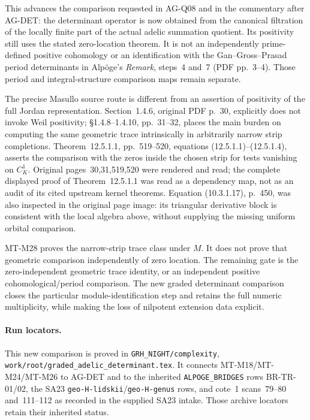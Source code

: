 This advances the comparison requested in
AG-Q08 and in the commentary after AG-DET:
the determinant operator is now obtained
from the canonical filtration of the
locally finite part of the actual
adelic summation quotient. Its positivity
still uses the stated zero-location
theorem. It is not an independently
prime-defined positive cohomology or
an identification with the
Gan--Gross--Prasad period determinants
in Alp\"oge's \emph{Remark}, steps~4
and~7 (PDF pp.~3--4). Those period and
integral-structure comparison maps
remain separate.

The precise Masullo source route is
different from an assertion of positivity
of the full Jordan representation.
Section~1.4.6, original PDF p.~30,
explicitly does not invoke Weil
positivity; \S1.4.8--1.4.10,
pp.~31--32, places the main burden
on computing the same geometric
trace intrinsically in arbitrarily
narrow strip completions.
Theorem~12.5.1.1, pp.~519--520,
equations (12.5.1.1)--(12.5.1.4),
asserts the comparison with the
zeros inside the chosen strip for
tests vanishing on \(C_K^1\).
Original pages~30,31,519,520
were rendered and read; the
complete displayed proof of
Theorem~12.5.1.1 was read as
a dependency map, not as an
audit of its cited upstream
kernel theorems. Equation
(10.3.1.17), p.~450, was
also inspected in the original
page image: its triangular
derivative block is consistent
with the local algebra above,
without supplying the missing
uniform orbital comparison.

MT-M28 proves the narrow-strip
trace class under \(M\). It
does not prove that geometric
comparison independently of
zero location. The remaining
gate is the zero-independent
geometric trace identity, or
an independent positive
cohomological/period comparison.
The new graded determinant
comparison closes the
particular module-identification
step and retains the full
numeric multiplicity, while
making the loss of nilpotent
extension data explicit.

\paragraph{Run locators.}
This new comparison is proved in
\texttt{GRH\_NIGHT/complexity},
\texttt{work/root/graded\_adelic\_determinant.tex}.
It connects MT-M18/MT-M24/MT-M26
to AG-DET and to the inherited
\texttt{ALPOGE\_BRIDGES} rows
BR-TR-01/02, the SA23
\texttt{geo-H-lidskii}/\texttt{geo-H-genus}
rows, and cote~1 scans~79--80
and~111--112 as recorded in
the supplied SA23 intake.
Those archive locators retain
their inherited status.

